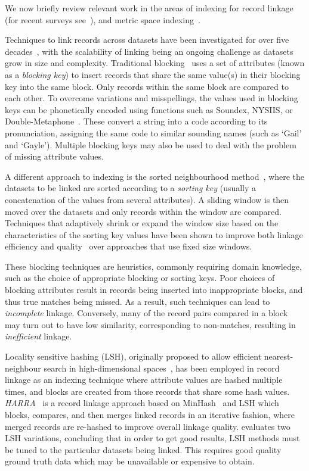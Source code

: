 \documentclass{llncs}
\begin{document}
We now briefly review relevant work in the areas of indexing for record
linkage (for recent surveys see~\cite{Chr12b,Pap16}), and metric space
indexing~\cite{Zezula2010}.

Techniques to link records across datasets have been investigated for
over five decades~\cite{Fel69,New59}, with the scalability of linking
being an ongoing challenge as datasets grow in size and complexity.
Traditional blocking~\cite{Chr12b} uses a set of attributes (known as a
\emph{blocking key}) to insert records that share the same value(s) in
their blocking key into the same block. Only records within the same
block are  compared to each other. To overcome variations and
misspellings, the values used in blocking keys can be phonetically
encoded using functions such as Soundex, NYSIIS, or
Double-Metaphone~\cite{Chr12}. These convert a string into a code
according to its pronunciation, assigning the same code to similar
sounding names (such as `Gail' and `Gayle'). Multiple blocking keys
may also be used to deal with the problem of missing attribute values.

A different approach to indexing is the sorted neighbourhood
method~\cite{Mon96}, where the datasets to be linked are sorted
according to a \emph{sorting key} (usually a concatenation of the values
from several attributes). A sliding window is then moved over the
datasets and only records within the window are compared. Techniques
that adaptively shrink or expand the window size based on the
characteristics of the sorting key values have been shown to improve
both linkage efficiency and quality~\cite{Dra12} over
approaches that use fixed size windows.

These blocking techniques are heuristics, commonly requiring domain
knowledge, such as the choice of appropriate blocking or sorting keys.
Poor choices of blocking attributes result in records being inserted
into inappropriate blocks, and thus true matches being missed. As a
result, such techniques can lead to \emph{incomplete} linkage.
Conversely, many of the record pairs compared in a block may turn out
to have low similarity, corresponding to non-matches, resulting in
\emph{inefficient} linkage.

Locality sensitive hashing (LSH), originally proposed to allow efficient
nearest-neighbour search in high-dimensional spaces~\cite{Ind98}, has
been employed in record linkage as an indexing technique where attribute
values are hashed multiple times, and blocks are created from those
records that share some hash values. \emph{HARRA}~\cite{Kim10} is a
record linkage approach based on MinHash~\cite{Broder1997} and LSH
which blocks, compares, and then merges linked records in an iterative
fashion, where merged records are re-hashed to improve overall linkage
quality. \cite{Steorts2014} evaluates two LSH variations, concluding
that in order to get good results, LSH methods must be tuned to the
particular datasets being linked. This requires good quality ground
truth data which may be unavailable or expensive to obtain.
\end{document}
